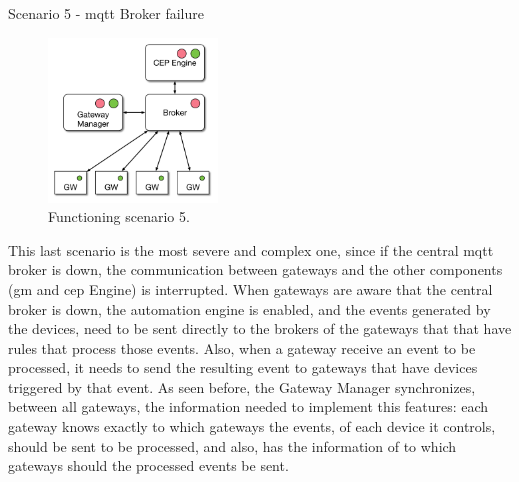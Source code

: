 \begin{Paragraph}{Scenario 5 - \ac{mqtt} Broker failure}
	\begin{figure}[H]
		\centering
		\includegraphics[width=0.4\textwidth]{figures/fs3.png}
		\caption{Functioning scenario 5.}
		\label{fig:fs3}
	\end{figure}

This last scenario is the most severe and complex one, since if the central \ac{mqtt} broker is down, the communication between gateways and the other components (\ac{gm} and \ac{cep} Engine) is interrupted. When gateways are aware that the central broker is down, the automation engine is enabled, and the events generated by the devices, need to be sent directly to the brokers of the gateways that that have rules that process those events. Also, when a gateway receive an event to be processed, it needs to send the resulting event to gateways that have devices triggered by that event. As seen before, the Gateway Manager synchronizes, between all gateways, the information needed to implement this features: each gateway knows exactly to which gateways the events, of each device it controls, should be sent to be processed, and also, has the information of to which gateways should the processed events be sent.

\end{Paragraph}

